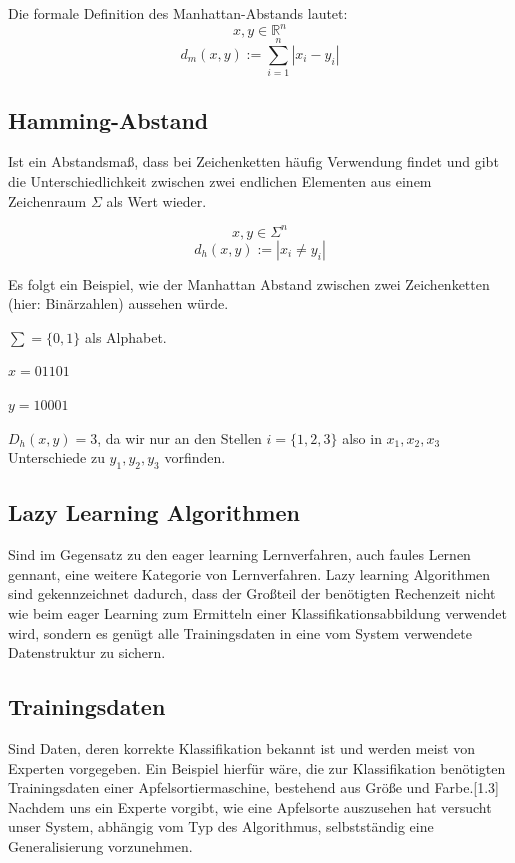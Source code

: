 \documentclass[a4paper]{scrartcl}
\begin{document}
\begin{multicols}{2}
                Die formale Definition des Manhattan-Abstands lautet:
                $$
                    x,y \in \mathbb{R}^n 
                $$
                $$
                    d_m(x,y):= \sum_{i=1}^{n} |x_i -y_i|
                $$
                         
            \subsection{Hamming-Abstand}
                Ist ein Abstandsmaß, dass bei Zeichenketten häufig Verwendung findet und gibt die Unterschiedlichkeit zwischen zwei endlichen Elementen aus einem Zeichenraum $\Sigma$ als Wert wieder.\par
	            $$ x,y \in \Sigma^n $$
	            $$ d_h(x,y):= |x_i \neq y_i |$$\par
                Es folgt ein Beispiel, wie der Manhattan Abstand zwischen zwei Zeichenketten (hier: Binärzahlen) aussehen würde.\par
                $\sum=\{0,1\}$ als Alphabet.\par
                $x = 01101$\par
                $y= 10001$\par
                $D_h(x,y)=3$, da wir nur an den Stellen $i=\{1,2,3\}$ also in $ x_1,x_2,x_3$ Unterschiede zu $y_1,y_2,y_3$ vorfinden.
                        
            \subsection{Lazy Learning Algorithmen}  
                Sind im Gegensatz zu den eager learning Lernverfahren, auch faules Lernen gennant, eine weitere Kategorie von Lernverfahren. Lazy learning Algorithmen sind gekennzeichnet dadurch, dass der Großteil der benötigten Rechenzeit nicht wie beim eager Learning zum Ermitteln einer Klassifikationsabbildung verwendet wird, sondern es genügt alle Trainingsdaten in eine vom System verwendete Datenstruktur zu sichern. 
                            
            \subsection{Trainingsdaten}
                Sind Daten, deren    korrekte Klassifikation   bekannt ist und werden meist von Experten vorgegeben.
                Ein Beispiel hierfür wäre, die zur Klassifikation benötigten Trainingsdaten einer Apfelsortiermaschine, bestehend aus Größe und Farbe.[1.3]
                Nachdem uns ein Experte vorgibt, wie eine Apfelsorte auszusehen hat versucht unser System, abhängig vom Typ des Algorithmus, selbstständig eine Generalisierung vorzunehmen. 
                        

\end{multicols}
\end{document}
